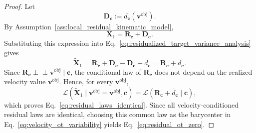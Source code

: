 \documentclass[10pt,twocolumn,letterpaper]{article}
\begin{document}
\begin{proof}
Let
\[
    \mathbf D_{\mathbf c}
    :=
    d_{\mathbf c}(\mathbf v^\text{obj}).
\]
By Assumption~\ref{ass:local_residual_kinematic_model},
\[
    \mathbf X_1
    =
    \mathbf R_{\mathbf c}
    +
    \mathbf D_{\mathbf c}.
\]
Substituting this expression into
Eq.~\eqref{eq:residualized_target_variance_analysis} gives
\[
    \widetilde{\mathbf X}_1
    =
    \mathbf R_{\mathbf c}
    +
    \mathbf D_{\mathbf c}
    -
    \mathbf D_{\mathbf c}
    +
    \bar d_{\mathbf c}
    =
    \mathbf R_{\mathbf c}
    +
    \bar d_{\mathbf c}.
\]
Since
$\mathbf R_{\mathbf c}\perp\!\!\!\perp \mathbf v^\text{obj}\mid\mathbf c$, the
conditional law of $\mathbf R_{\mathbf c}$ does not depend on the realized
velocity value $\mathbf v^\text{obj}$. Hence, for every $\mathbf v^\text{obj}$,
\[
    \mathcal L
    \left(
        \widetilde{\mathbf X}_1
        \mid
        \mathbf v^\text{obj}=\mathbf v^\text{obj},
        \mathbf c
    \right)
    =
    \mathcal L
    \left(
        \mathbf R_{\mathbf c}
        +
        \bar d_{\mathbf c}
        \mid
        \mathbf c
    \right),
\]
which proves Eq.~\eqref{eq:residual_laws_identical}. Since all
velocity-conditioned residual laws are identical, choosing this common law as
the barycenter in Eq.~\eqref{eq:velocity_ot_variability} yields
Eq.~\eqref{eq:residual_ot_zero}.


\end{proof}
\end{document}
